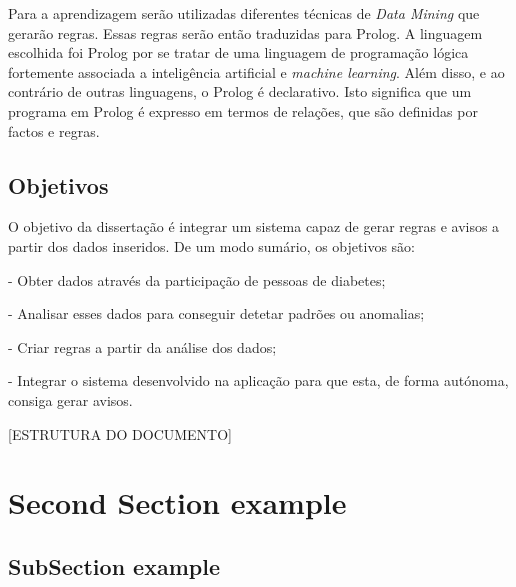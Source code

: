 Para a aprendizagem serão utilizadas diferentes técnicas de \textit{Data Mining} que gerarão regras. Essas regras serão então traduzidas para Prolog. A linguagem escolhida foi Prolog por se tratar de uma linguagem de programação lógica fortemente associada a inteligência artificial e \textit{machine learning}. Além disso, e ao contrário de outras linguagens, o Prolog é declarativo. Isto significa que um programa em Prolog é expresso em termos de relações, que são definidas por factos e regras.

\subsection{Objetivos}

O objetivo da dissertação é integrar um sistema capaz de gerar regras e avisos a partir dos dados inseridos. De um modo sumário, os objetivos são:

- Obter dados através da participação de pessoas de diabetes;

- Analisar esses dados para conseguir detetar padrões ou anomalias;

- Criar regras a partir da análise dos dados;

- Integrar o sistema desenvolvido na aplicação para que esta, de forma autónoma, consiga gerar avisos.

[ESTRUTURA DO DOCUMENTO]
\section{Second Section example}
\subsection{SubSection example}
\lipsum[7-10]

